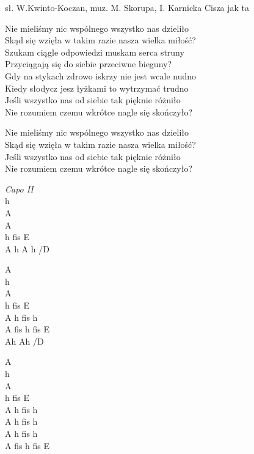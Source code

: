 {sł. W.Kwinto-Koczan, muz. M. Skorupa, I. Karnicka}
{Cisza jak ta}
\begin{text}

Nie mieliśmy nic wspólnego wszystko nas dzieliło\\
Skąd się wzięła w takim razie nasza wielka miłość?\\
Szukam ciągle odpowiedzi muskam serca struny\\
Przyciągają się do siebie przeciwne bieguny?\\

\hfill\break
Gdy na stykach zdrowo iskrzy nie jest wcale nudno\\
Kiedy słodycz jesz łyżkami to wytrzymać trudno\\
Jeśli wszystko nas od siebie tak pięknie różniło\\
Nie rozumiem czemu wkrótce nagle się skończyło?

\hfill\break
\hfill\break
\hfill\break
Nie mieliśmy nic wspólnego wszystko nas dzieliło\\
Skąd się wzięła w takim razie nasza wielka miłość?\\
Jeśli wszystko nas od siebie tak pięknie różniło\\
Nie rozumiem czemu wkrótce nagle się skończyło?

\end{text}
\begin{chord}
\ifOneCol \else \small{ \fi
\textit{Capo II}\\
h\\
A\\
A\\
h fis E\\
\OneColVin A h A h /D

A\\
h\\
A\\
h fis E\\
\OneColVin A h fis h\\
\OneColVin  A fis h fis E\\
\OneColVin Ah Ah /D

A\\
h\\
A\\
h fis E\\
\OneColVin A h fis h\\
\OneColVin A h fis h\\
\OneColVin A h fis h\\
\OneColVin A fis h fis E
\ifOneCol \else }\fi
\end{chord}

